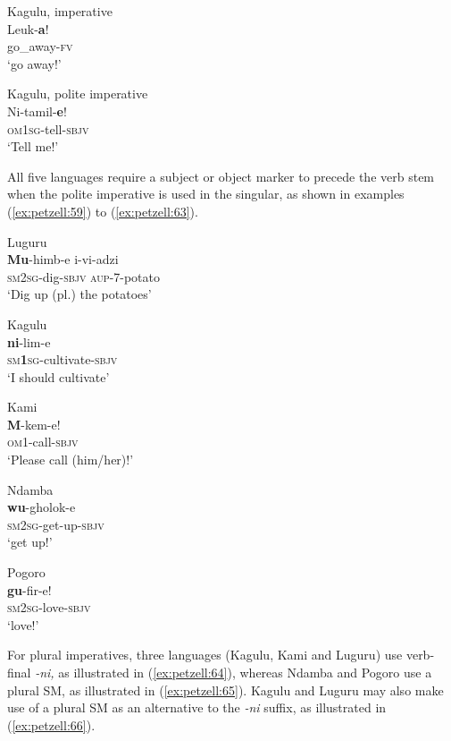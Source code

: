 \documentclass[output=paper,
            colorlinks, citecolor=brown
            ,draftmode
		  ]{langscibook}
\begin{document}
\ea\label{ex:petzell:57}Kagulu, imperative\\
\gll Leuk-\textbf{a}!  \\
go\_away-\textsc{fv}\\
\glt `go away!'


\ex\label{ex:petzell:58}Kagulu, polite imperative\\
\gll Ni-tamil-\textbf{e}! \\
\textsc{om}1\textsc{sg}{}-tell-\textsc{sbjv}\\
\glt `Tell me!'
\z


All five languages require a subject or object marker to precede the verb stem when the polite imperative is used in the singular, as shown in examples (\ref{ex:petzell:59}) to (\ref{ex:petzell:63}).


\ea\label{ex:petzell:59}Luguru\\
\gll \textbf{Mu}{}-himb-e      i-vi-adzi \\
\textsc{{sm2sg}}{}-dig-\textsc{sbjv}  \textsc{aup}{}-7-potato\\
\glt `Dig up (pl.) the potatoes'


\ex\label{ex:petzell:60}Kagulu\\
\gll \textbf{ni}{}-lim-e \\
\textsc{{sm}}\textbf{1}\textsc{{sg}{}-}cultivate-\textsc{sbjv}\\
\glt `I should cultivate'


\ex\label{ex:petzell:61}Kami\\
\gll \textbf{M}{}-kem-e! \\
\textsc{{om1}}{}-call-\textsc{sbjv}\\
\glt `Please call (him/her)!'


\ex\label{ex:petzell:62}Ndamba\\
\gll \textbf{wu}{}-gholok-e  \\
\textsc{{sm2sg}}{}-get-up-\textsc{sbjv}\\
\glt `get up!'


\ex\label{ex:petzell:63}Pogoro\\
\gll \textbf{gu}{}-fir-e! \\
\textsc{{sm2sg}}{}-love-\textsc{sbjv}\\
\glt `love!'
\z


For plural imperatives, three languages (Kagulu, Kami and Luguru) use verb-final \textit{{}-ni,} as illustrated in  (\ref{ex:petzell:64}), whereas Ndamba and Pogoro use a plural SM, as illustrated in  (\ref{ex:petzell:65}). Kagulu and Luguru may also make use of a plural SM as an alternative to the \textit{-ni} suffix, as illustrated in  (\ref{ex:petzell:66}).
\end{document}
